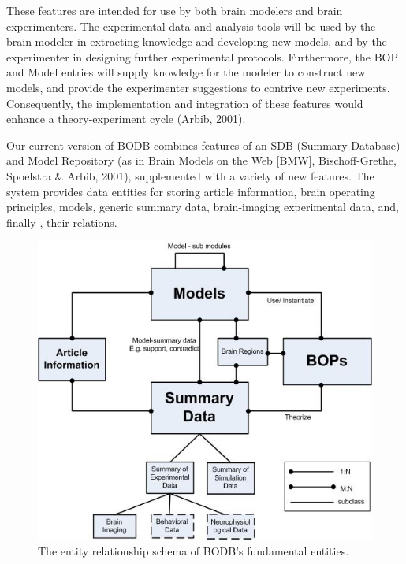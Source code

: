 \documentclass[letterpaper,10pt,english]{sphinxmanual}
\begin{document}
These features are intended for use by both brain modelers and brain experimenters. The experimental data and analysis tools will be used by the brain modeler in extracting knowledge and developing new models, and by the experimenter in designing further experimental protocols. Furthermore, the BOP and Model entries will supply knowledge for the modeler to construct new models, and provide the experimenter suggestions to contrive new experiments. Consequently, the implementation and integration of these features would enhance a theory-experiment cycle (Arbib, 2001).

Our current version of BODB combines features of an SDB (Summary Database) and Model Repository (as in Brain Models on the Web {[}BMW{]}, Bischoff-Grethe, Spoelstra \& Arbib, 2001), supplemented with a variety of new features. The system provides data entities for storing article information, brain operating principles, models, generic summary data, brain-imaging experimental data, and, finally , their relations.
\begin{figure}[htbp]
\centering
\capstart

\includegraphics{bodb_entity_schema.png}
\caption{The entity relationship schema of BODB’s fundamental entities.}\end{figure}
\end{document}
